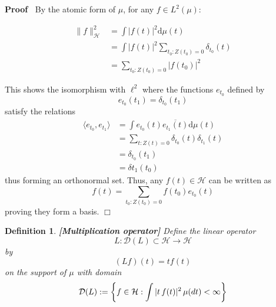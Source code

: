 \documentclass{article}
\newcommand{\assign}{:=}
\newcommand{\mathd}{\mathrm{d}}
\newcommand{\tmstrong}[1]{\textbf{#1}}
\newenvironment{proof}{\noindent\textbf{Proof\ }}{\hspace*{\fill}$\Box$\medskip}
\newtheorem{definition}{Definition}
\begin{document}
\begin{proof}
  By the atomic form of $\mu$, for any $f \in L^2 (\mu)$:
  
  \begin{align}
    \|f\|_{\mathcal{H}}^2 & = \int |f (t) |^2 \mathd \mu (t) \\
    & = \int |f (t) |^2  \sum_{t_0 : Z (t_0) = 0} \delta_{t_0}  (t) \\
    & = \sum_{t_0 : Z (t_0) = 0} |f (t_0) |^2 
  \end{align}
  
  This shows the isomorphism with $\ell^2$ where the functions $e_{t_0}$
  defined by
  \begin{equation}
    e_{t_0} (t_1) = \delta_{t_0} (t_1)
  \end{equation}
  satisfy the relations
  \begin{equation}
    \begin{array}{ll}
      \langle e_{t_0}, e_{t_1} \rangle & = \int e_{t_0} (t) \overline{e_{t_1}
      (t)} \mathd \mu (t)\\
      & = \sum_{t : Z (t) = 0} \delta_{t_0 } (t) \delta_{t_1} (t)\\
      & = \delta_{{t_0} } (t_1)\\
      & = \delta t_1 (t_0)
    \end{array}
  \end{equation}
  thus forming an orthonormal set. Thus, any $f (t) \in \mathcal{H}$ can be
  written as
  \begin{equation}
    f (t) = \sum_{t_0 : Z (t_0) = 0} f (t_0) e_{t_0} (t)
  \end{equation}
  proving they form a basis.
\end{proof}

\begin{definition}
  {\tmstrong{[Multiplication operator]\label{def:L}}} Define the linear
  operator
  \begin{equation}
    L : \mathcal{D} (L) \subset \mathcal{H} \to \mathcal{H}
  \end{equation}
  by
  \begin{equation}
    (Lf) (t) = tf (t)
  \end{equation}
  on the support of $\mu$ with domain
  \begin{equation}
    \mathcal{D} (L) \assign \left\{ f \in \mathcal{H}: \int |t \hspace{0.17em}
    f (t) |^2  \hspace{0.17em} \mu (dt) < \infty \right\}
  \end{equation}
\end{definition}
\end{document}
